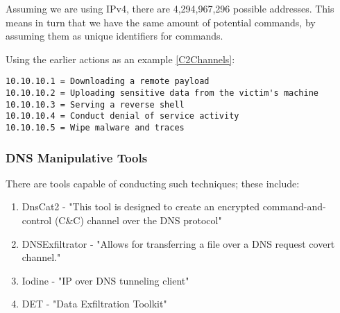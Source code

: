 Assuming we are using IPv4, there are 4,294,967,296 possible addresses. This means in turn that we have the same amount of potential commands, by assuming them as unique identifiers for commands. \citep{DNSTunneling}

Using the earlier actions as an example \ref{C2Channels}:
\begin{lstlisting}[label=DNSOPCodes,caption=Psuedo DNS OPCoding via IP resolution]
10.10.10.1 = Downloading a remote payload
10.10.10.2 = Uploading sensitive data from the victim's machine
10.10.10.3 = Serving a reverse shell
10.10.10.4 = Conduct denial of service activity 
10.10.10.5 = Wipe malware and traces
\end{lstlisting}


\subsubsection{DNS Manipulative Tools}
There are tools capable of conducting such techniques; these include:
\begin{enumerate}
    \item DnsCat2 - "This tool is designed to create an encrypted command-and-control (C&C) channel over the DNS protocol" \citep{dnscat2}
    \item DNSExfiltrator - "Allows for transferring a file over a DNS request covert channel." \citep{DNSExfiltrator}
    \item Iodine - "IP over DNS tunneling client" \citep{iodine}
    \item DET - "Data Exfiltration Toolkit" \citep{DET}
\end{enumerate}




